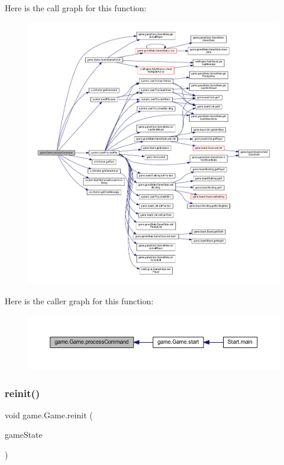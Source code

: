 Here is the call graph for this function\+:
\nopagebreak
\begin{figure}[H]
\begin{center}
\leavevmode
\includegraphics[width=350pt]{classgame_1_1_game_a8016a543126f802488e94125daccce45_cgraph}
\end{center}
\end{figure}
Here is the caller graph for this function\+:
\nopagebreak
\begin{figure}[H]
\begin{center}
\leavevmode
\includegraphics[width=350pt]{classgame_1_1_game_a8016a543126f802488e94125daccce45_icgraph}
\end{center}
\end{figure}
\mbox{\label{classgame_1_1_game_a901ff06a39733ad5f8cf080f5833e252}} 
\subsubsection{\texorpdfstring{reinit()}{reinit()}}
{\footnotesize\ttfamily void game.\+Game.\+reinit (\begin{DoxyParamCaption}\item[{\mbox{\hyperlink{classgame_1_1game_state_1_1_game_state}{Game\+State}}}]{game\+State }\end{DoxyParamCaption})\hspace{0.3cm}{\ttfamily [inline]}}

